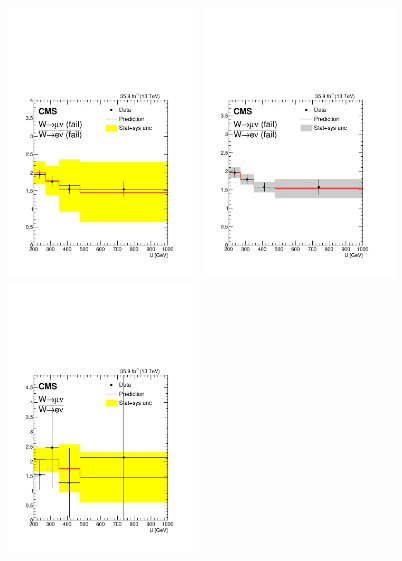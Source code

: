 \begin{figure}
\centering
\includegraphics[width=0.45\textwidth]{figures/pullsImpact/ratio_wmn_fail_wen_fail_shapes_prefit.pdf}
\includegraphics[width=0.45\textwidth]{figures/pullsImpact/ratio_wmn_fail_wen_fail_shapes_fit_b.pdf}\\
\includegraphics[width=0.45\textwidth]{figures/pullsImpact/ratio_wmn_wen_shapes_prefit.pdf}

\end{figure}
